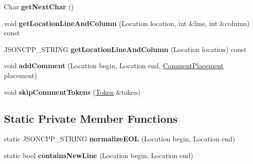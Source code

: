\begin{DoxyCompactItemize}
Char {\bfseries get\+Next\+Char} ()
\item 
\mbox{\label{classJson_1_1OurReader_af482c8e718615646e13a996292e18d74}} 
void {\bfseries get\+Location\+Line\+And\+Column} (Location location, int \&line, int \&column) const
\item 
\mbox{\label{classJson_1_1OurReader_ac129e94cdc260822b2fd24e2ca35e636}} 
J\+S\+O\+N\+C\+P\+P\+\_\+\+S\+T\+R\+I\+NG {\bfseries get\+Location\+Line\+And\+Column} (Location location) const
\item 
\mbox{\label{classJson_1_1OurReader_ad7318c37469a9106069a236fb4b10e1f}} 
void {\bfseries add\+Comment} (Location begin, Location end, \hyperlink{namespaceJson_a4fc417c23905b2ae9e2c47d197a45351}{Comment\+Placement} placement)
\item 
\mbox{\label{classJson_1_1OurReader_a856dea44d92578c276856d7a65a4ebdc}} 
void {\bfseries skip\+Comment\+Tokens} (\hyperlink{classJson_1_1OurReader_1_1Token}{Token} \&token)
\end{DoxyCompactItemize}
\subsection*{Static Private Member Functions}
\begin{DoxyCompactItemize}
\item 
\mbox{\label{classJson_1_1OurReader_a73ec369ee36598e008b80e36263691be}} 
static J\+S\+O\+N\+C\+P\+P\+\_\+\+S\+T\+R\+I\+NG {\bfseries normalize\+E\+OL} (Location begin, Location end)
\item 
\mbox{\label{classJson_1_1OurReader_ab9e83f5a3d9dab2dabce367a4faa2b1b}} 
static bool {\bfseries contains\+New\+Line} (Location begin, Location end)
\end{DoxyCompactItemize}
